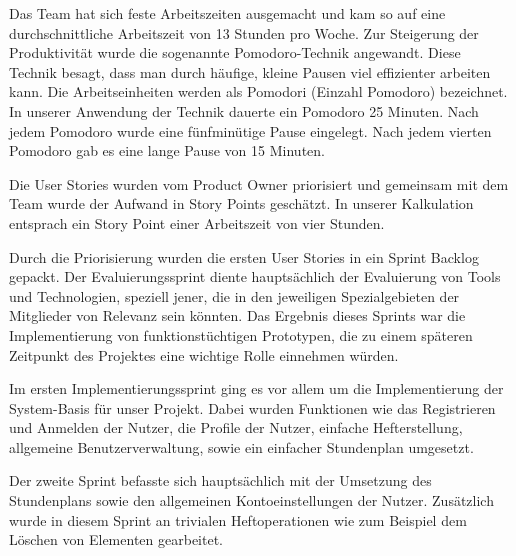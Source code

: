 
Das Team hat sich feste Arbeitszeiten ausgemacht und kam so auf eine durchschnittliche Arbeitszeit von 13 Stunden pro Woche. Zur Steigerung der Produktivität wurde die sogenannte Pomodoro-Technik \cite{POMOT} angewandt. Diese Technik besagt, dass man durch häufige, kleine Pausen viel effizienter arbeiten kann. Die Arbeitseinheiten werden als Pomodori (Einzahl Pomodoro) bezeichnet. In unserer Anwendung der Technik dauerte ein Pomodoro 25 Minuten. Nach jedem Pomodoro wurde eine fünfminütige Pause eingelegt. Nach jedem vierten Pomodoro gab es eine lange Pause von 15 Minuten.


Die User Stories wurden vom Product Owner priorisiert und gemeinsam mit dem Team wurde der Aufwand in Story Points geschätzt. In unserer Kalkulation entsprach ein Story Point einer Arbeitszeit von vier Stunden. 

Durch die Priorisierung wurden die ersten User Stories in ein Sprint Backlog gepackt. Der Evaluierungssprint diente hauptsächlich der Evaluierung von Tools und Technologien, speziell jener, die in den jeweiligen Spezialgebieten der Mitglieder von Relevanz sein könnten. Das Ergebnis dieses Sprints war die Implementierung von funktionstüchtigen Prototypen, die zu einem späteren Zeitpunkt des Projektes eine wichtige Rolle einnehmen würden.


Im ersten Implementierungssprint ging es vor allem um die Implementierung der System-Basis für unser Projekt. Dabei wurden Funktionen wie das Registrieren und Anmelden der Nutzer, die Profile der Nutzer, einfache Hefterstellung, allgemeine Benutzerverwaltung, sowie ein einfacher Stundenplan umgesetzt.


\newpage

Der zweite Sprint befasste sich hauptsächlich mit der Umsetzung des Stundenplans sowie den allgemeinen Kontoeinstellungen der Nutzer. Zusätzlich wurde in diesem Sprint an trivialen Heftoperationen wie zum Beispiel dem Löschen von Elementen gearbeitet.

